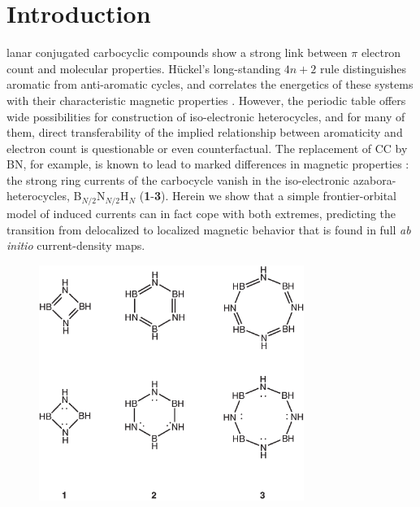 \section{Introduction}
\lettrine{}{}lanar conjugated carbocyclic compounds show a strong link between $\pi$ electron count and molecular properties. H\"uckel's long-standing $4n+2$ rule distinguishes aromatic from anti-aromatic cycles, and correlates the energetics of these systems with their characteristic magnetic properties \cite{r01}. However, the periodic table offers wide possibilities for construction of iso-electronic heterocycles, and for many of them, direct transferability of the implied relationship between aromaticity and electron count is questionable or even counterfactual.  The replacement of CC by BN, for example, is known to lead to marked differences in magnetic properties \cite{r02}: the strong ring currents of the carbocycle vanish in the iso-electronic azabora-heterocycles, B$_{N/2}$N$_{N/2}$H$_N$ (\textbf{1}-\textbf{3}).  Herein we show that a simple frontier-orbital model of induced currents can in fact cope with both extremes, predicting the transition from delocalized to localized magnetic behavior that is found in full \textit{ab initio} current-density maps.
\begin{figure} [htp]
\begin{center}
\includegraphics[width=3.4in]{huckel/figures/scheme1.eps}
\end{center}
\end{figure}

